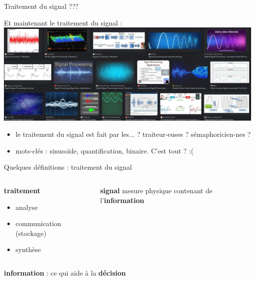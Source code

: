 \documentclass[9pt, aspectratio=169]{beamer}
\begin{document}
\begin{frame}{\og Traitement du signal \fg{} ???} %

Et maintenant le traitement du signal :
\pause
\includegraphics[width=\textwidth]{fig/search_results_signal_proc.jpg}
\pause
\begin{itemize}
    \item le traitement du signal est fait par les... ? \pause traiteur-euses ? \pause sémaphoricien-nes ?
    \pause
    \item mots-clés : sinusoïde, quantification, binaire. C'est tout ?  :(
\end{itemize}

\end{frame}

\begin{frame}{Quelques définitions : \og traitement du signal \fg{}} %
\begin{columns}
   \begin{column}{0.4\textwidth}
        \begin{myblockred}{\textbf{traitement}}
        \begin{itemize}
            \item analyse
            \item communication (stockage)
            \item synthèse
        \end{itemize}
        \end{myblockred}
        
   \end{column}
   \begin{column}{0.59\textwidth}
		\begin{myblockred}{\textbf{signal}}
        mesure physique contenant de l'\textbf{information}
        \end{myblockred}
   \end{column}
\end{columns}

\vspace{1cm}
\textbf{information} : ce qui aide à la \textbf{décision}

\end{frame}
\end{document}
